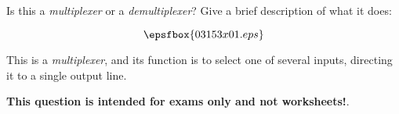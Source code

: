 

Is this a {\it multiplexer} or a {\it demultiplexer}?  Give a brief description of what it does:

$$\epsfbox{03153x01.eps}$$







This is a {\it multiplexer}, and its function is to select one of several inputs, directing it to a single output line.







{\bf This question is intended for exams only and not worksheets!}.




